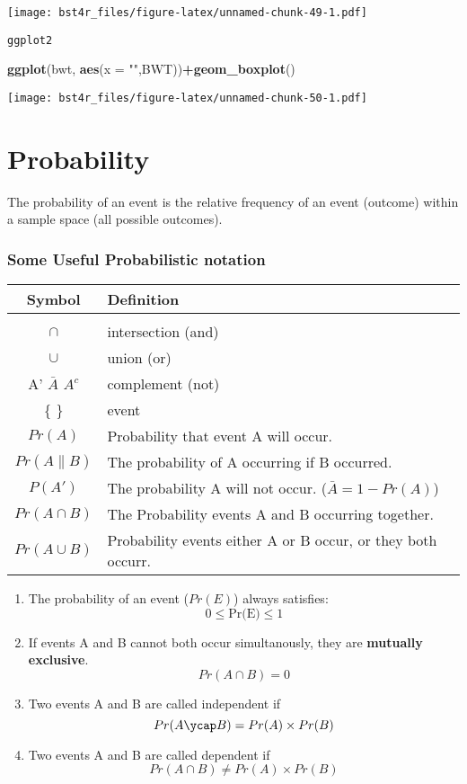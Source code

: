 \documentclass[12pt,]{article}
\newenvironment{Shaded}{\begin{snugshade}}{\end{snugshade}}
\newcommand{\DataTypeTok}[1]{\textcolor[rgb]{0.13,0.29,0.53}{#1}}
\newcommand{\KeywordTok}[1]{\textcolor[rgb]{0.13,0.29,0.53}{\textbf{#1}}}
\newcommand{\NormalTok}[1]{#1}
\newcommand{\OperatorTok}[1]{\textcolor[rgb]{0.81,0.36,0.00}{\textbf{#1}}}
\newcommand{\StringTok}[1]{\textcolor[rgb]{0.31,0.60,0.02}{#1}}
\providecommand{\tightlist}{%
  \setlength{\itemsep}{0pt}\setlength{\parskip}{0pt}}
\begin{document}
\texttt{[image: bst4r\_files/figure-latex/unnamed-chunk-49-1.pdf]}

\texttt{ggplot2}

\begin{Shaded}
\begin{Highlighting}[]
\KeywordTok{ggplot}\NormalTok{(bwt, }\KeywordTok{aes}\NormalTok{(}\DataTypeTok{x =} \StringTok{""}\NormalTok{,BWT))}\OperatorTok{+}\KeywordTok{geom_boxplot}\NormalTok{()}
\end{Highlighting}
\end{Shaded}

\texttt{[image: bst4r\_files/figure-latex/unnamed-chunk-50-1.pdf]}

\hypertarget{probability}{%
\section{Probability}\label{probability}}

The probability of an event is the relative frequency of an event
(outcome) within a sample space (all possible outcomes).

\hypertarget{some-useful-probabilistic-notation}{%
\subsubsection{Some Useful Probabilistic
notation}\label{some-useful-probabilistic-notation}}

\begin{longtable}[]{@{}cl@{}}
\toprule
Symbol & Definition\tabularnewline
\midrule
\endhead
&\tabularnewline
\(\cap\) & intersection (and)\tabularnewline
\(\cup\) & union (or)\tabularnewline
A' \(\bar{A}\) \(A^c\) & complement (not)\tabularnewline
\{ \} & event\tabularnewline
\(Pr(A)\) & Probability that event A will occur.\tabularnewline
\(Pr(A\|B)\) & The probability of A occurring if B
occurred.\tabularnewline
\(P(A')\) & The probability A will not occur.
(\(\bar{A}=1-Pr(A)\))\tabularnewline
\(Pr(A\cap B)\) & The Probability events A and B occurring
together.\tabularnewline
\(Pr(A\cup B)\) & Probability events either A or B occur, or they both
occurr.\tabularnewline
\bottomrule
\end{longtable}

\begin{enumerate}
\def\labelenumi{\arabic{enumi}.}
\tightlist
\item
  The probability of an event (\(Pr(E)\)) always satisfies:
  \[0 \leq \text{Pr(E)} \leq 1\]
\item
  If events A and B cannot both occur simultanously, they are
  \textbf{mutually exclusive}. \[Pr(A\cap B)=0\]
\item
  Two events A and B are called independent if
  \[Pr(A\ycap B)=Pr(A)\times Pr(B)\]
\item
  Two events A and B are called dependent if
  \[Pr(A\cap B)\ne Pr(A)\times Pr(B)\]
\end{enumerate}
\end{document}
